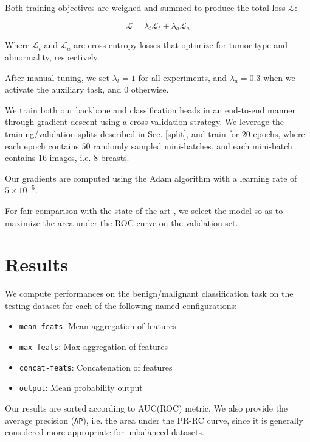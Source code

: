 \documentclass[11pt]{article}
\begin{document}
Both training objectives are weighed and summed to produce
the total loss \(\mathcal{L}\):

\begin{equation}
\mathcal{L} = \lambda_{t}\mathcal{L}_{t} + \lambda_{a}\mathcal{L}_{a}
\end{equation}

Where \(\mathcal{L}_t\) and \(\mathcal{L}_a\) are cross-entropy losses that optimize
for tumor type and abnormality, respectively.

After manual tuning, we set \(\lambda_t=1\) for all experiments,
and \(\lambda_a=0.3\) when we activate the auxiliary task, and \(0\) otherwise.

We train both our backbone and classification heads in an end-to-end manner through
gradient descent using a cross-validation strategy.
We leverage the training/validation splits described in Sec. \ref{split}, and train for
\(20\) epochs, where each epoch contains \(50\) randomly sampled mini-batches,
and each mini-batch contains \(16\) images, i.e. \(8\) breasts.

Our gradients are computed using the Adam algorithm with a learning rate of
\(5 \times 10^{-5}\).

For fair comparison with the state-of-the-art \autocite{walsh22}, we select the model so
as to maximize the area under the ROC curve on the validation set.

\section{Results}
\label{sec:org6ba6acb}

We compute performances on the benign/malignant classification task
on the testing dataset for each of the following named configurations:

\begin{itemize}
\item \texttt{mean-feats}: Mean aggregation of features
\item \texttt{max-feats}: Max aggregation of features
\item \texttt{concat-feats}: Concatenation of features
\item \texttt{output}: Mean probability output
\end{itemize}

Our results are sorted according to AUC(ROC) metric.
We also provide the average precision (\texttt{AP}), i.e. the area under the PR-RC curve, since
it is generally considered more appropriate for imbalanced datasets.
\end{document}
